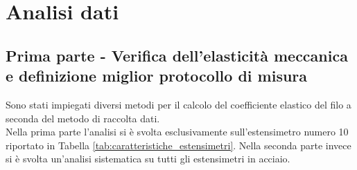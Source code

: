 \documentclass[a4paper,11pt,oneside]{article}
\begin{document}
\section{Analisi dati}

\subsection{Prima parte - Verifica dell'elasticità meccanica e definizione miglior protocollo di misura}
Sono stati impiegati diversi metodi per il calcolo del coefficiente elastico del filo a seconda del metodo di raccolta dati.\\
Nella prima parte l'analisi si è svolta esclusivamente sull'estensimetro numero 10 riportato in Tabella \ref{tab:caratteristiche_estensimetri}. Nella seconda parte invece si è svolta un'analisi sistematica su tutti gli estensimetri in acciaio.
\end{document}
